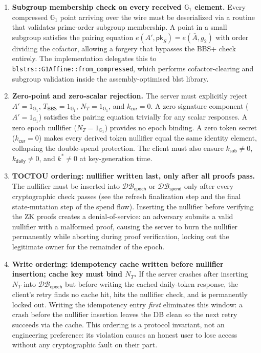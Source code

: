 \documentclass[11pt]{article}
\theoremstyle{definitionstyle}
\theoremstyle{plain}
\newcommand{\DB}{\mathcal{DB}}
\begin{document}
\begin{enumerate}[leftmargin=*,label=\textbf{C\arabic*.}]
\item \textbf{Subgroup membership check on every received $\mathbb{G}_1$ element.}
  Every compressed $\mathbb{G}_1$ point arriving over the wire must be
  deserialized via a routine that validates prime-order subgroup membership.
  A point in a small subgroup satisfies the pairing equation
  $e(A', \mathsf{pk}_S) = e(\bar{A}, g_2)$ with order dividing the cofactor,
  allowing a forgery that bypasses the BBS+ check entirely.  The
  implementation delegates this to \texttt{blstrs::G1Affine::from\_compressed},
  which performs cofactor-clearing and subgroup validation inside the
  assembly-optimised blst library.

\item \textbf{Zero-point and zero-scalar rejection.}
  The server must explicitly reject $A' = 1_{\mathbb{G}_1}$,
  $T_{\mathsf{BBS}} = 1_{\mathbb{G}_1}$, $N_T = 1_{\mathbb{G}_1}$, and
  $k_{\mathsf{cur}} = 0$.  A zero signature component ($A' = 1_{\mathbb{G}_1}$)
  satisfies the pairing equation trivially for any scalar responses.
  A zero epoch nullifier ($N_T = 1_{\mathbb{G}_1}$) provides no epoch binding.
  A zero token secret ($k_{\mathsf{cur}} = 0$) makes every derived token
  nullifier equal the same identity element, collapsing the double-spend
  protection.  The client must also ensure $k_{\mathsf{sub}} \neq 0$,
  $k_{\mathsf{daily}} \neq 0$, and $k^* \neq 0$ at key-generation time.

\item \textbf{TOCTOU ordering: nullifier written last, only after all proofs pass.}
  The nullifier must be inserted into $\DB_{\mathsf{epoch}}$ or
  $\DB_{\mathsf{spend}}$ only after every cryptographic check passes (see the
  refresh finalization step and the final state-mutation step of the spend
  flow).  Inserting the nullifier before verifying
  the ZK proofs creates a denial-of-service: an adversary submits a valid
  nullifier with a malformed proof, causing the server to burn the nullifier
  permanently while aborting during proof verification, locking out the
  legitimate owner for the remainder of the epoch.

\item \textbf{Write ordering: idempotency cache written before nullifier insertion; cache key must bind $N_T$.}
  If the server crashes after inserting $N_T$ into $\DB_{\mathsf{epoch}}$ but
  before writing the cached daily-token response, the client's retry finds no
  cache hit, hits the nullifier check, and is permanently locked out.
  Writing the idempotency entry \emph{first} eliminates this window: a crash
  before the nullifier insertion leaves the DB clean so the next retry
  succeeds via the cache.  This ordering is a protocol invariant, not an
  engineering preference: its violation causes an honest user to lose access
  without any cryptographic fault on their part.


\end{enumerate}
\end{document}
